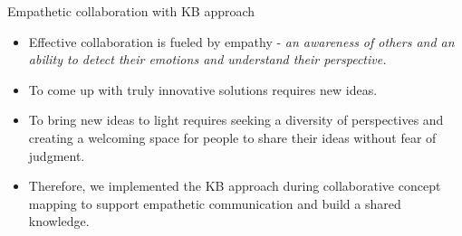 \begin{frame}[allowframebreaks]{Empathetic collaboration with KB approach}
    \begin{itemize}
        \item Effective collaboration is fueled by empathy - \emph{an awareness of
        others and an ability to detect their emotions and 
        understand their perspective.} 
        \item To come up with truly  innovative solutions requires new ideas. 
        \item To bring new ideas 
        to light requires seeking a diversity of perspectives 
        and creating a welcoming space for people to share 
        their ideas without fear of judgment.
        \item Therefore, we implemented the KB approach during 
        collaborative concept mapping to support empathetic communication and 
        build a shared knowledge.
    \end{itemize}

\end{frame}

